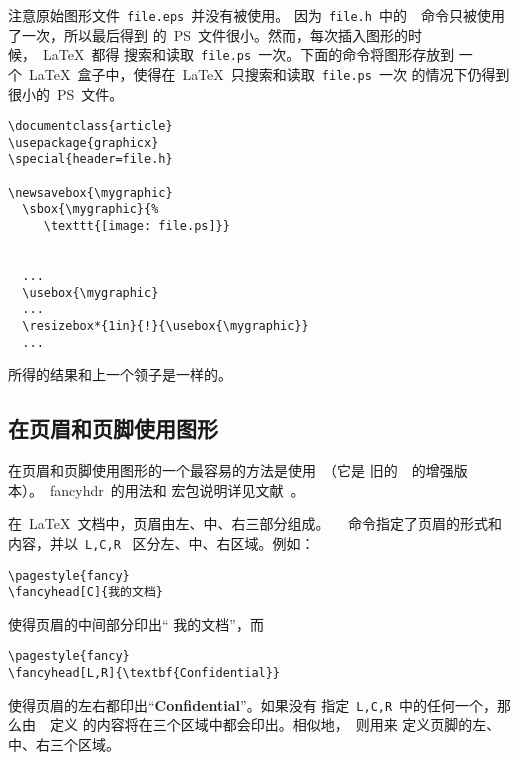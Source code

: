 \noindent 注意原始图形文件~\texttt{file.eps}~并没有被使用。
因为~\texttt{file.h}~中的~\PS~命令只被使用了一次，所以最后得到
的~PS~文件很小。然而，每次插入图形的时候，~\LaTeX{}~都得
搜索和读取~\texttt{file.ps}~一次。下面的命令将图形存放到
一个~\LaTeX{}~盒子中，使得在~\LaTeX{}~只搜索和读取~\texttt{file.ps}~一次
的情况下仍得到很小的~PS~文件。
\begin{Verbatim}[xleftmargin=1cm]
\documentclass{article}
\usepackage{graphicx}
\special{header=file.h}

\newsavebox{\mygraphic}
  \sbox{\mygraphic}{%
     \texttt{[image: file.ps]}}


  ...
  \usebox{\mygraphic}
  ...
  \resizebox*{1in}{!}{\usebox{\mygraphic}}
  ...

\end{Verbatim}
所得的结果和上一个领子是一样的。

\subsection{在页眉和页脚使用图形}\label{ssec:headgraph}

在页眉和页脚使用图形的一个最容易的方法是使用~（它是
旧的~~的增强版本）。~\textsf{fancyhdr}~的用法和
宏包说明详见文献~\cite{fancyhdr}。

在~\LaTeX{}~文档中，页眉由左、中、右三部分组成。
~~命令指定了页眉的形式和内容，并以~\texttt{L,C,R}~
区分左、中、右区域。例如：
\begin{Verbatim}[xleftmargin=1cm]
\pagestyle{fancy}
\fancyhead[C]{我的文档}
\end{Verbatim}
使得页眉的中间部分印出``{ 我的文档}''，而
\begin{Verbatim}[xleftmargin=1cm]
\pagestyle{fancy}
\fancyhead[L,R]{\textbf{Confidential}}
\end{Verbatim}
使得页眉的左右都印出``\textbf{Confidential}''。如果没有
指定~\texttt{L,C,R}~中的任何一个，那么由~~定义
的内容将在三个区域中都会印出。相似地，~则用来
定义页脚的左、中、右三个区域。


